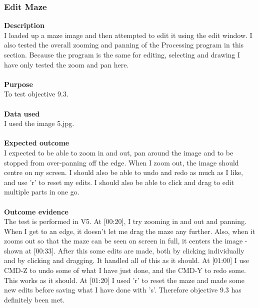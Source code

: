 \documentclass[titlepage]{article}
\begin{document}
\subsubsection{Edit Maze}
\textbf{Description}\\
I loaded up a maze image and then attempted to edit it using the edit window. I also tested the overall zooming and panning of the Processing program in this section. Because the program is the same for editing, selecting and drawing I have only tested the zoom and pan here.\\\\
\textbf{Purpose}\\
To test objective 9.3. \\\\
\textbf{Data used} \\
I used the image 5.jpg.\\\\
\textbf{Expected outcome}\\
I expected to be able to zoom in and out, pan around the image and to be stopped from over-panning off the edge. When I zoom out, the image should centre on my screen. I should also be able to undo and redo as much as I like, and use 'r' to reset my edits. I should also be able to click and drag to edit multiple parts in one go.\\\\
\textbf{Outcome evidence}\\
The test is performed in V5. At [00:20], I try zooming in and out and panning. When I get to an edge, it doesn't let me drag the maze any further. Also, when it zooms out so that the maze can be seen on screen in full, it centers the image - shown at [00:33]. After this some edits are made, both by clicking individually and by clicking and dragging. It handled all of this as it should. At [01:00] I use CMD-Z to undo some of what I have just done, and the CMD-Y to redo some. This works as it should. At [01:20] I used 'r' to reset the maze and made some new edits before saving what I have done with 's'. Therefore objective 9.3 has definitely been met.
\end{document}
